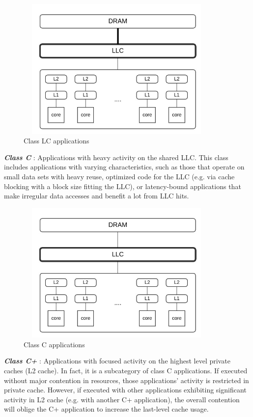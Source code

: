 \documentclass[diploma]{Styles/softlab-thesis}
\begin{document}
\begin{figure}[ht!]
\begin{center}
\includegraphics[width=100mm, height=70mm]{images/category_LC.jpg}
\caption{Class LC applications \label{overflow}}
\end{center}
\end{figure}

\textbf{\emph{Class C}} : Applications with heavy activity on the shared LLC. This class includes applications with varying characteristics, such as those that operate on small data sets with heavy reuse, optimized code for the LLC (e.g. via cache blocking with a block size fitting the LLC), or latency-bound applications that make irregular data accesses and benefit a lot from LLC hits. \\ 

\begin{figure}[ht!]
\begin{center}
\includegraphics[width=100mm, height=70mm]{images/category_C.jpg}
\caption{Class C applications \label{overflow}}
\end{center}
\end{figure}

\textbf{\emph{Class C+}} : Applications with focused activity on the highest level private caches (L2 cache). In fact, it is a subcategory of class C applications. If executed without major contention in resources, those applications' activity is restricted in private cache. However, if executed with other applications exhibiting significant activity in L2 cache (e.g. with another C+ application), the overall contention will oblige the C+ application to increase the last-level cache usage. \\ 
\end{document}
